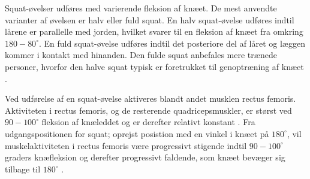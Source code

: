 \noindent 
Squat-øvelser udføres med varierende fleksion af knæet. De mest anvendte varianter af øvelsen er halv eller fuld squat. En halv squat-øvelse udføres indtil lårene er parallelle med jorden, hvilket svarer til en fleksion af knæet fra omkring $180-80^{\circ}$. En fuld squat-øvelse udføres indtil det posteriore del af låret og læggen kommer i kontakt med hinanden. Den fulde squat anbefales mere trænede personer, hvorfor den halve squat typisk er foretrukket til genoptræning af knæet \citep{escamilla2001}.

Ved udførelse af en squat-øvelse aktiveres blandt andet musklen rectus femoris. Aktiviteten i rectus femoris, og de resterende quadricepsmuskler, er størst ved $90-100^{\circ}$ fleksion af knæleddet og er derefter relativt konstant \citep{schoenfeld2010}. Fra udgangspositionen for squat; oprejst posistion med en vinkel i knæet på $180^{\circ}$, vil muskelaktiviteten i rectus femoris være progressivt stigende indtil $90-100^{\circ}$ graders knæfleksion og derefter progressivt faldende, som knæet bevæger sig tilbage til $180^{\circ}$ \citep{escamilla}. 





